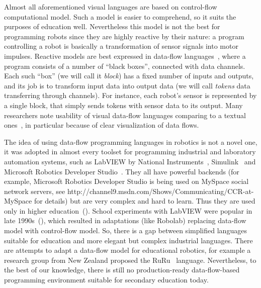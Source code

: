 \documentclass[conference]{IEEEtran}
\begin{document}
Almost all aforementioned visual languages are based on control-flow computational model. Such a model is easier to comprehend, so it suits the purposes of education well. Nevertheless this model is not the best for programming robots since they are highly reactive by their nature: a program controlling a robot is basically a transformation of sensor signals into motor impulses. Reactive models are best expressed in data-flow languages~\cite{johnston2004advances}, where a program consists of a number of ``black boxes'', connected with data channels. Each such ``box'' (we will call it \emph{block}) has a fixed number of inputs and outputs, and its job is to transform input data into output data (we will call \emph{tokens} data transferring through channels). For instance, each robot's sensor is represented by a single block, that simply sends tokens with sensor data to its output. Many researchers note usability of visual data-flow languages comparing to a textual ones~\cite{johnston2004advances}, in particular because of clear visualization of data flows.

The idea of using data-flow programming languages in robotics is not a novel one, it was adopted in almost every toolset for programming industrial and laboratory automation systems, such as LabVIEW by National Instruments~\cite{kodosky1991visual}, Simulink~\cite{dabney2004mastering} and Microsoft Robotics Developer Studio~\cite{jackson2007microsoft}. They all have powerful backends (for example, Microsoft Robotics Developer Studio is being used on MySpace social network servers, see http://channel9.msdn.com/Shows/Communicating/CCR-at-MySpace for details) but are very complex and hard to learn. Thus they are used only in higher education~(\cite{stefanovic2011labview,yi2005labview}). School experiments with LabVIEW were popular in late 1990s~(\cite{cyr1997low,portsmore1999robolab}), which resulted in adaptations (like Robolab) replacing data-flow model  with control-flow model. So, there is a gap between simplified languages suitable for education and more elegant but complex industrial languages. There are attempts to adapt a data-flow model for educational robotics, for example a research group from New Zealand proposed the RuRu~\cite{diprose2011ruru} language. Nevertheless, to the best of our knowledge, there is still no production-ready data-flow-based programming environment suitable for secondary education today.
\end{document}
